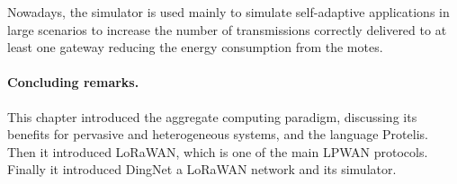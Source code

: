Nowadays, the simulator is used mainly to simulate self-adaptive applications in large scenarios to increase the number of transmissions correctly delivered to at least one gateway reducing the energy consumption from the motes.

\paragraph{Concluding remarks.} This chapter introduced the aggregate computing paradigm, discussing its benefits for pervasive and heterogeneous systems, and the language Protelis. Then it introduced LoRaWAN, which is one of the main LPWAN protocols. 
Finally it introduced DingNet a LoRaWAN network and its simulator.